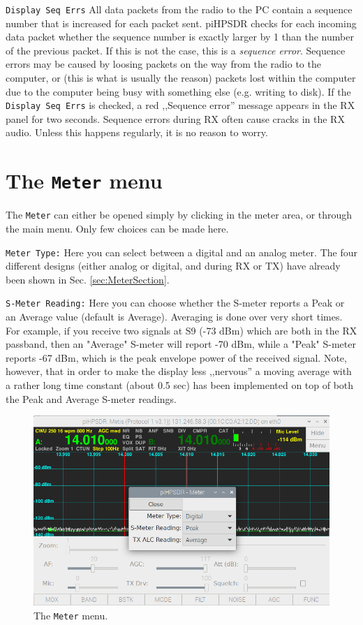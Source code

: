 \documentclass[12pt]{book}
\def\rett#1{\texttt{\color{red}#1}}
\def\bltt#1{\texttt{\color{blue}#1}}
\begin{document}
\rett{Display Seq Errs} All data packets from the radio to the PC contain
a sequence number that is increased  for each packet sent. piHPSDR
checks for each incoming data packet whether the sequence number is 
exactly larger by 1 than the number of the previous packet. If this is not
the case, this is a \textit{sequence error}. Sequence errors may be caused
by loosing packets on the way from the radio to the computer, or
(this is what is usually the reason) packets lost within the computer due
to the computer being busy with something else (e.g. writing to disk).
 If the \rett{Display Seq Errs} is checked, a red
,,Sequence error'' message appears in the RX panel for two seconds.
Sequence errors during RX often cause cracks in the RX audio. Unless this
happens regularly, it is no reason to worry.



\section{The \texttt{Meter} menu}

The \bltt{Meter} can either be opened simply by clicking in the meter
area, or through the main menu. Only few choices can be made here.

\rett{Meter Type:} Here you can select between a digital and an analog
meter. The four different designs (either analog or digital, and during
RX or TX) have already been shown in Sec. \ref{sec:MeterSection}.

\rett{S-Meter Reading:} Here you can choose whether the S-meter reports
a Peak or an Average value (default is Average).
 Averaging is done over very short times. For
example, if you receive two signals at S9 (-73 dBm) which are both in the
RX passband, then an "Average" S-meter will report -70 dBm, while a "Peak"
S-meter reports -67 dBm, which is the peak envelope power of the received
signal.
Note, however, that in order to make the
display less ,,nervous'' a moving average with a rather long time constant
(about 0.5 sec) has been implemented on top of both the Peak and Average
S-meter readings.

\begin{figure}[h]
\center
\includegraphics[width=12cm]{MeterMenu.png}
\caption{The \bltt{Meter} menu.}
\label{fig:Meter}
\end{figure}
\end{document}
